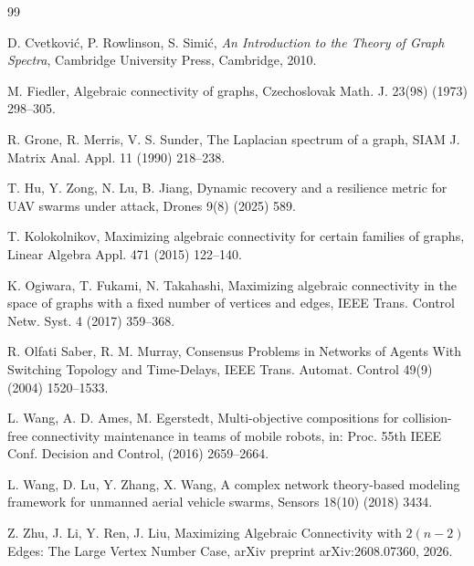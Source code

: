 \documentclass[11pt]{article}
\theoremstyle{definition}
\begin{document}
\begin{thebibliography}{99}
  \setlength{\itemsep}{0pt}


  D. Cvetkovi\'{c}, P. Rowlinson, S. Simi\'{c}, \emph{An Introduction to the Theory of Graph Spectra}, Cambridge University Press, Cambridge, 2010.

  M. Fiedler, Algebraic connectivity of graphs, Czechoslovak Math. J. 23(98) (1973) 298--305.


  R. Grone, R. Merris, V. S. Sunder, The Laplacian spectrum of a graph, SIAM J. Matrix Anal. Appl. 11 (1990) 218--238.

  T. Hu, Y. Zong, N. Lu, B. Jiang,
  Dynamic recovery and a resilience metric for UAV swarms under attack, Drones 9(8) (2025) 589.

  T. Kolokolnikov, Maximizing algebraic connectivity for certain families of graphs, Linear Algebra Appl. 471 (2015) 122--140.


  K. Ogiwara, T. Fukami, N. Takahashi, Maximizing algebraic connectivity in the space of graphs with a fixed number of vertices and edges, IEEE Trans. Control Netw. Syst. 4 (2017) 359--368.

  R. Olfati Saber, R. M. Murray, Consensus Problems in Networks of Agents With Switching Topology and Time-Delays, IEEE Trans. Automat. Control 49(9) (2004) 1520--1533.

  L. Wang, A. D. Ames, M. Egerstedt, Multi-objective compositions for collision-free connectivity maintenance in teams of mobile robots, in: Proc. 55th IEEE Conf. Decision and Control,
  (2016) 2659--2664.

  L. Wang, D. Lu, Y. Zhang, X. Wang,
  A complex network theory-based modeling framework for unmanned
  aerial vehicle swarms,
  Sensors  18(10) (2018) 3434.





  Z. Zhu, J. Li, Y. Ren, J. Liu,  Maximizing Algebraic Connectivity with $2(n-2)$ Edges: The Large Vertex Number Case, arXiv preprint arXiv:2608.07360, 2026.

\end{thebibliography}
\end{document}
